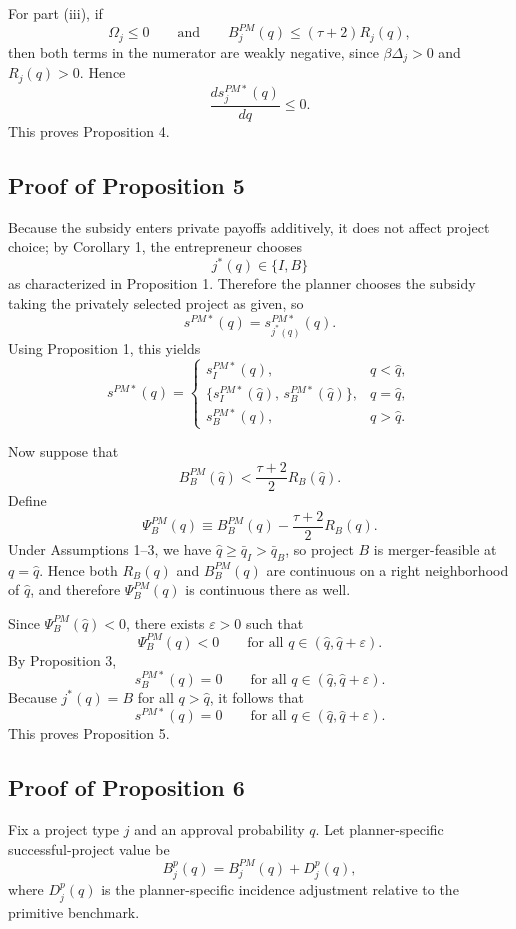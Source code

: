 For part (iii), if
\[
\Omega_j\le 0
\qquad\text{and}\qquad
B_j^{PM}(q)\le (\tau+2)R_j(q),
\]
then both terms in the numerator are weakly negative, since \(\beta\Delta_j>0\) and \(R_j(q)>0\).
Hence
\[
\frac{ds_j^{PM*}(q)}{dq}\le 0.
\]
This proves Proposition 4.

\subsection{Proof of Proposition 5}

Because the subsidy enters private payoffs additively, it does not affect project choice; by
Corollary 1, the entrepreneur chooses
\[
j^*(q)\in\{I,B\}
\]
as characterized in Proposition 1. Therefore the planner chooses the subsidy taking the privately
selected project as given, so
\[
s^{PM*}(q)=s_{j^*(q)}^{PM*}(q).
\]
Using Proposition 1, this yields
\[
s^{PM*}(q)=
\begin{cases}
s_I^{PM*}(q), & q<\hat q,\\[0.3em]
\{s_I^{PM*}(\hat q),\,s_B^{PM*}(\hat q)\}, & q=\hat q,\\[0.3em]
s_B^{PM*}(q), & q>\hat q.
\end{cases}
\]

Now suppose that
\[
B_B^{PM}(\hat q)<\frac{\tau+2}{2}R_B(\hat q).
\]
Define
\[
\Psi_B^{PM}(q)\equiv B_B^{PM}(q)-\frac{\tau+2}{2}R_B(q).
\]
Under Assumptions 1--3, we have \(\hat q\ge \bar q_I>\bar q_B\), so project \(B\) is merger-feasible at
\(q=\hat q\). Hence both \(R_B(q)\) and \(B_B^{PM}(q)\) are continuous on a right neighborhood of \(\hat q\),
and therefore \(\Psi_B^{PM}(q)\) is continuous there as well.

Since \(\Psi_B^{PM}(\hat q)<0\), there exists \(\varepsilon>0\) such that
\[
\Psi_B^{PM}(q)<0
\qquad
\text{for all } q\in(\hat q,\hat q+\varepsilon).
\]
By Proposition 3,
\[
s_B^{PM*}(q)=0
\qquad
\text{for all } q\in(\hat q,\hat q+\varepsilon).
\]
Because \(j^*(q)=B\) for all \(q>\hat q\), it follows that
\[
s^{PM*}(q)=0
\qquad
\text{for all } q\in(\hat q,\hat q+\varepsilon).
\]
This proves Proposition 5.

\subsection{Proof of Proposition 6}

Fix a project type \(j\) and an approval probability \(q\). Let planner-specific successful-project value be
\[
B_j^p(q)=B_j^{PM}(q)+D_j^p(q),
\]
where \(D_j^p(q)\) is the planner-specific incidence adjustment relative to the primitive benchmark.

